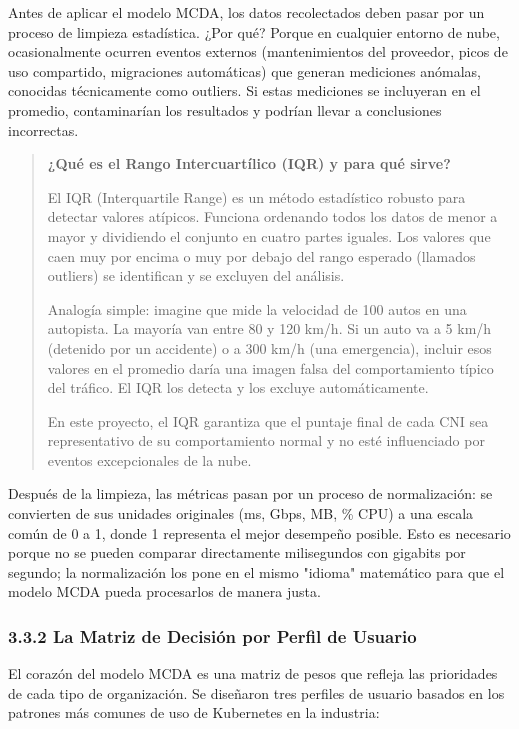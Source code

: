\documentclass[journal]{IEEEtran}
\begin{document}
Antes de aplicar el modelo MCDA, los datos recolectados deben pasar por un proceso de limpieza estadística. ¿Por qué? Porque en cualquier entorno de nube, ocasionalmente ocurren eventos externos (mantenimientos del proveedor, picos de uso compartido, migraciones automáticas) que generan mediciones anómalas, conocidas técnicamente como outliers. Si estas mediciones se incluyeran en el promedio, contaminarían los resultados y podrían llevar a conclusiones incorrectas.

\begin{quote}
\textbf{¿Qué es el Rango Intercuartílico (IQR) y para qué sirve?}

El IQR (Interquartile Range) es un método estadístico robusto para detectar valores atípicos. Funciona ordenando todos los datos de menor a mayor y dividiendo el conjunto en cuatro partes iguales. Los valores que caen muy por encima o muy por debajo del rango esperado (llamados outliers) se identifican y se excluyen del análisis.

Analogía simple: imagine que mide la velocidad de 100 autos en una autopista. La mayoría van entre 80 y 120 km/h. Si un auto va a 5 km/h (detenido por un accidente) o a 300 km/h (una emergencia), incluir esos valores en el promedio daría una imagen falsa del comportamiento típico del tráfico. El IQR los detecta y los excluye automáticamente.

En este proyecto, el IQR garantiza que el puntaje final de cada CNI sea representativo de su comportamiento normal y no esté influenciado por eventos excepcionales de la nube.
\end{quote}

Después de la limpieza, las métricas pasan por un proceso de normalización: se convierten de sus unidades originales (ms, Gbps, MB, \% CPU) a una escala común de 0 a 1, donde 1 representa el mejor desempeño posible. Esto es necesario porque no se pueden comparar directamente milisegundos con gigabits por segundo; la normalización los pone en el mismo "idioma" matemático para que el modelo MCDA pueda procesarlos de manera justa.

\subsubsection{3.3.2 La Matriz de Decisión por Perfil de Usuario}

El corazón del modelo MCDA es una matriz de pesos que refleja las prioridades de cada tipo de organización. Se diseñaron tres perfiles de usuario basados en los patrones más comunes de uso de Kubernetes en la industria:
\end{document}
